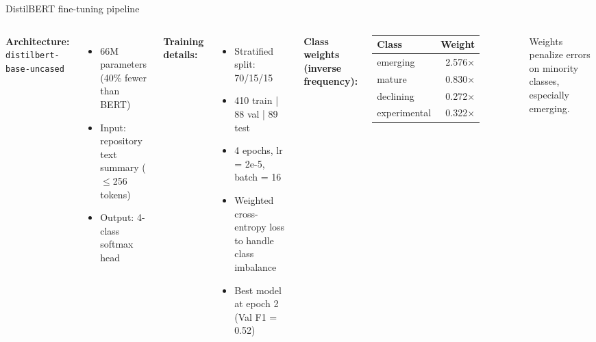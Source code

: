 \begin{frame}{DistilBERT fine-tuning pipeline}

  \begin{columns}
    \textbf{Architecture:} \texttt{distilbert-base-uncased}
    \begin{itemize}
      \item 66M parameters (40\% fewer than BERT)
      \item Input: repository text summary ($\leq$256 tokens)
      \item Output: 4-class softmax head
    \end{itemize}

    \bigskip
    \textbf{Training details:}
    \begin{itemize}
      \item Stratified split: 70/15/15
      \item 410 train | 88 val | 89 test
      \item 4 epochs, lr = 2e-5, batch = 16
      \item Weighted cross-entropy loss to handle class imbalance
      \item Best model at epoch 2 (Val F1 = 0.52)
    \end{itemize}

    \textbf{Class weights (inverse frequency):}

    \vspace{0.5em}
    \begin{tabular}{lr}
      \toprule
      Class & Weight \\
      \midrule
      \textcolor{emerging}{emerging} & 2.576$\times$ \\
      mature & 0.830$\times$ \\
      declining & 0.272$\times$ \\
      experimental & 0.322$\times$ \\
      \bottomrule
    \end{tabular}

    \bigskip
    \small Weights penalize errors on minority classes, especially \textcolor{emerging}{emerging}.
  \end{columns}

\end{frame}


